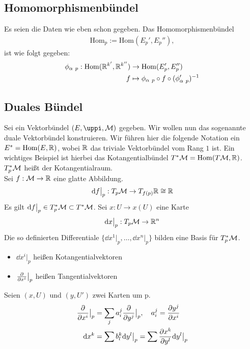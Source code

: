 \subsection{Homomorphismenbündel}
Es seien die Daten wie eben schon gegeben.
Das Homomorphismenbündel
\begin{align}
\mathrm{Hom}_p := \mathrm{Hom}(E_{p}', E_{p}''),
\end{align}
ist wie folgt gegeben:
\begin{align}
\phi_{\alpha \ p} : \mathrm{Hom}(\mathbb{R}^{k'}, \mathbb{R}^{k''}) &\to \mathrm{Hom}(E_{p}', E_{p}'')\\
f &\mapsto \phi_{\alpha \ p} \circ f \circ (\phi_{\alpha \ p}')^{-1}
\end{align}

\subsection{Duales Bündel}
Sei ein Vektorbündel $(E, \pi, \mfk)$ gegeben. 
Wir wollen nun das sogenannte duale Vektorbündel konstruieren.
Wir führen hier die folgende Notation ein $E^* = \mathrm{Hom}(E, \mathbb{R})$, wobei $\mathbb{R}$ das triviale Vektorbündel vom Rang $1$ ist.
Ein wichtiges Beispiel ist hierbei das Kotangentialbündel $T^{*}\mathcal{M} = \mathrm{Hom}(T\mathcal{M} , \mathbb{R})$.
$T^{*}_{p}\mathcal{M}$ heißt der Kotangentialraum.\\
Sei $f: \mathcal{M} \to \mathbb{R}$ eine glatte Abbildung.
\begin{align}
\dd f \big\vert_p : T_p \mathcal{M} \to T_{f(p)}\mathbb{R} \cong \mathbb{R}
\end{align}
Es gilt $\dd f\big\vert_p \in T_p^* \mathcal{M} \subset T^* \mathcal{M}$.
Sei $x: U \to x(U)$ eine Karte 
\begin{align}
\dd x \big\vert_p : T_p \mathcal{M} \to \mathbb{R}^n
\end{align}
Die so definierten Differentiale $\{ \dd x^1 \big\vert_p, \dots , \dd x^n \big\vert_p \}$ bilden eine Basis für $T_p^* \mathcal{M}$.
\begin{itemize}
\item $\dd x^i \big\vert_p$ heißen Kotangentialvektoren
\item $\pdv{x^i} \big\vert_p$ heißen Tangentialvektoren
\end{itemize}
Seien $(x, U)$ und $(y, U')$ zwei Karten um p.
\begin{align}
\pdv{x^i}\big\vert_p &= \sum_j a^j_i \pdv{y^j} \big\vert_p, \quad a^j_i = \pdv{y^j}{x^i} \\
\dd x^k &= \sum b^k_l \dd y^l \big\vert_p = \sum \pdv{x^k}{y^l} \dd y^l \big\vert_p
\end{align}

